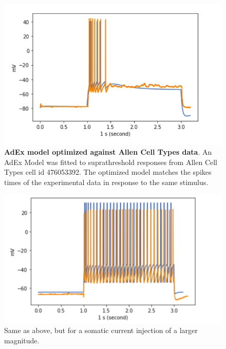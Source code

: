 \begin{figure}
    \centering
    \includegraphics[scale=1]{figures/adexp_fit_allen_spec_id_476053392.png}
    \caption[Optimized AdEx model from Allen Cell Types (A)]{\textbf{AdEx model optimized against Allen Cell Types data}.
    An AdEx Model was fitted to suprathreshold responses from Allen Cell Types cell id 476053392.
    The optimized model matches the spikes times of the experimental data in response to the same stimulus.}
    \label{fig:specimen_476053392_A}
\end{figure}

\begin{figure}
    \centering
    \includegraphics[scale=1]{figures/28spikesB95}
    \caption[Optimized AdEx model from Allen Cell Types (B)]{Same as above, but for a somatic current injection of a larger magnitude.}
    \label{fig:specimen_476053392_B}
\end{figure}


